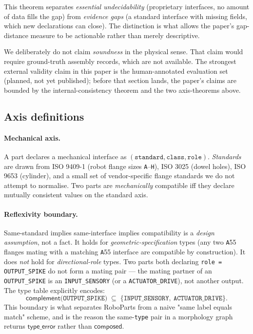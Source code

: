\documentclass[11pt,twocolumn]{article}
\begin{document}
This theorem separates \emph{essential undecidability} (proprietary
interfaces, no amount of data fills the gap) from
\emph{evidence gaps} (a standard interface with missing fields,
which new declarations can close). The distinction is what
allows the paper's gap-distance measure to be actionable rather
than merely descriptive.

We deliberately do not claim \emph{soundness} in the physical
sense. That claim would require ground-truth assembly records,
which are not available. The strongest external validity claim in
this paper is the human-annotated evaluation set
(planned, not yet published); before that section lands, the
paper's claims are bounded by the internal-consistency theorem
and the two axis-theorems above.

\subsection{Axis definitions}

\paragraph{Mechanical axis.}
A part declares a mechanical interface as
$(\texttt{standard}, \texttt{class}, \texttt{role})$. \emph{Standards}
are drawn from ISO 9409-1 (robot flange sizes \texttt{A}--\texttt{H}),
ISO 3025 (dowel holes), ISO 9653 (cylinder), and a small set of
vendor-specific flange standards we do not attempt to normalise.
Two parts are \emph{mechanically} compatible iff they declare
mutually consistent values on the standard axis.

\paragraph{Reflexivity boundary.}
Same-standard implies same-interface implies compatibility is a
\emph{design assumption}, not a fact. It holds for
\emph{geometric-specification} types (any two \texttt{A}55 flanges
mating with a matching \texttt{A}55 interface are compatible by
construction). It does \emph{not} hold for \emph{directional-role}
types. Two parts both declaring \texttt{role = OUTPUT\_SPIKE} do not
form a mating pair — the mating partner of an \texttt{OUTPUT\_SPIKE}
is an \texttt{INPUT\_SENSORY} (or a \texttt{ACTUATOR\_DRIVE}), not
another output. The type table explicitly encodes:
\begin{equation}
  \mathsf{complement}\!\bigl(\texttt{OUTPUT\_SPIKE}\bigr) \;\subseteq\;
    \{\texttt{INPUT\_SENSORY},\ \texttt{ACTUATOR\_DRIVE}\}.
  \label{eq:complement}
\end{equation}
This boundary is what separates RoboParts from a naive "same label
equals match" scheme, and is the reason the same-\texttt{type} pair
in a morphology graph returns $\mathsf{type\_error}$ rather than
$\mathsf{composed}$.
\end{document}
